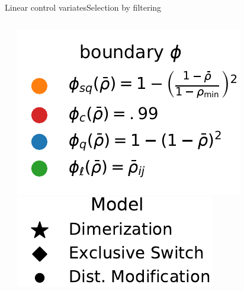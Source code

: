 \documentclass[9pt]{beamer}
\newcommand{\bottomcite}[1]{\vspace*{\fill} {\scriptsize \parencite{#1}}}
\begin{document}
\begin{frame}{Linear control variates}{Selection by filtering}
\begin{columns}
\begin{column}{.55\textwidth}
\begin{columns}
\begin{column}{.6\textwidth}
                        \end{column}
                        \begin{column}{.39\textwidth}
                            \includegraphics[width=\textwidth]{../gfx/legend_1.pdf}
                            \includegraphics[width=\textwidth]{../gfx/legend_models.pdf}
                        \end{column}
                    \end{columns}
        \end{column}
    \end{columns}
    \bottomcite{backenkohler2019control}
\end{frame}
\end{document}
